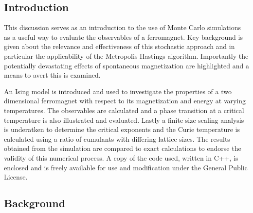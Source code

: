 \documentclass[a4paper]{article}
\begin{document}
\subsection{Introduction}


This discussion serves as an introduction to the use of Monte Carlo simulations as a useful way to evaluate the observables of a ferromagnet. Key background is given about the relevance and effectiveness of this stochastic approach and in particular the applicability of the Metropolis-Hastings algorithm. Importantly the potentially devastating effects of spontaneous magnetization are highlighted and a means to avert this is examined. 

An Ising model is introduced and used to investigate the properties of a two dimensional ferromagnet with respect to its magnetization and energy at varying temperatures. The observables are calculated and a phase transition at a critical temperature is also illustrated and evaluated. Lastly a finite size scaling analysis is underatken to determine the critical exponents and the Curie temperature is calculated using a ratio of cumulants with differing lattice sizes. The results obtained from the simulation are compared to exact calculations to endorse the validity of this numerical process. A copy of the code used, written in C++, is enclosed and is freely available for use and modification under the General Public License.
% 


\subsection{Background}\label{sec:back}
\end{document}
